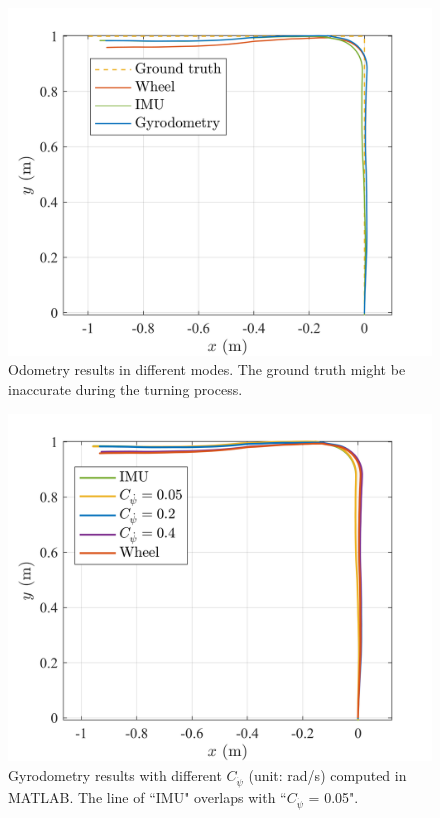 \begin{figure}[hbt!]
    \centering
    \includegraphics[width = 0.9\linewidth]{media/odometry_traj.png}
    \caption{Odometry results in different modes. The ground truth might be inaccurate during the turning process.}
    \label{fig:odometry_traj}
\end{figure}

\begin{figure}[hbt!]
    \centering
    \includegraphics[width = 1.0\linewidth]{media/odometry_tune.png}
    \caption{Gyrodometry results with different \(C_{\dot{\psi}}\) (unit: rad/s) computed in MATLAB. The line of ``IMU" overlaps with ``\(C_{\dot{\psi}}\) = 0.05".}
    \label{fig:odometry_tune}
\end{figure}